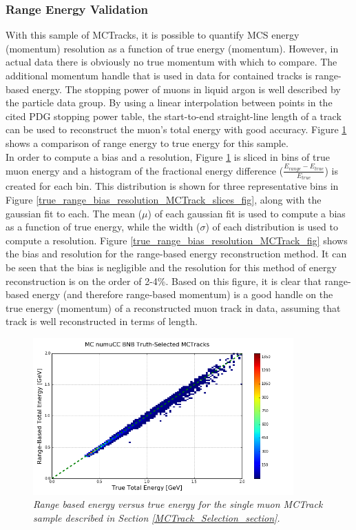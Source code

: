 \subsubsection{Range Energy Validation}\label{Range_Energy_Validation_section}
With this sample of {\sc MCTracks}, it is possible to quantify MCS energy (momentum) resolution as a function of true energy (momentum). However, in actual {\ub} data there is obviously no true momentum with which to compare. The additional momentum handle that is used in data for contained tracks is range-based energy. The stopping power of muons in liquid argon is well described by the particle data group\cite{PDG_spline_table}. By using a linear interpolation between points in the cited PDG stopping power table, the start-to-end straight-line length of a track can be used to reconstruct the muon's total energy with good accuracy. Figure \ref{true_range_energy_MCTrack_fig} shows a comparison of range energy to true energy for this sample. \\

In order to compute a bias and a resolution, Figure \ref{true_range_energy_MCTrack_fig} is sliced in bins of true muon energy and a histogram of the fractional energy difference ($\frac{E_{range} - E_{true}}{E_{true}}$) is created for each bin. This distribution is shown for three representative bins in Figure \ref{true_range_bias_resolution_MCTrack_slices_fig}, along with the gaussian fit to each.  The mean ($\mu$) of each gaussian fit is used to compute a bias as a function of true energy, while the width ($\sigma$) of each distribution is used to compute a resolution. Figure \ref{true_range_bias_resolution_MCTrack_fig} shows the bias and resolution for the range-based energy reconstruction method. It can be seen that the bias is negligible and the resolution for this method of energy reconstruction is on the order of 2-4\%. Based on this figure, it is clear that range-based energy (and therefore range-based momentum) is a good handle on the true energy (momentum) of a reconstructed muon track in {\ub} data, assuming that track is well reconstructed in terms of length.

\begin{figure}[ht!]
\begin{center}
\includegraphics[width=100mm]{Figures/true_range_comparison_MCTracks.png}
\end{center}
\caption{\textit{Range based energy versus true energy for the single muon {\sc MCTrack} sample described in Section \ref{MCTrack_Selection_section}.}}
\label{true_range_energy_MCTrack_fig}
\end{figure}


